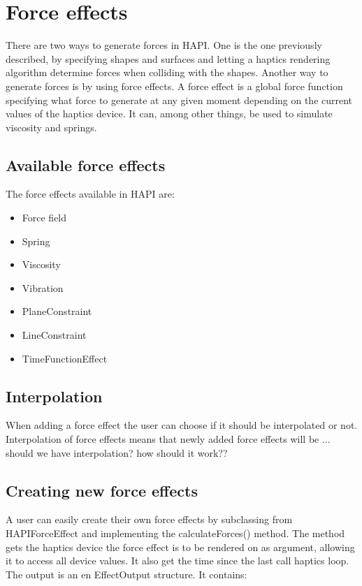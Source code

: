 \chapter{Force effects}
There are two ways to generate forces in HAPI. One is the one
previously described, by specifying shapes and surfaces and letting
a haptics rendering algorithm determine forces when colliding with the
shapes. Another way to generate forces is by using force effects. A
force effect is a global force function specifying what force to
generate at any given moment depending on the current values of the
haptics device. It can, among other things, be used to simulate
viscosity and springs. 

\section{Available force effects}
The force effects available in HAPI are:

\begin{itemize}
\item Force field
\item Spring
\item Viscosity
\item Vibration
\item PlaneConstraint
\item LineConstraint
\item TimeFunctionEffect 
\end{itemize}

\section{Interpolation}
When adding a force effect the user can choose if it should be
interpolated or not. Interpolation of force effects means that newly
added force effects will be ... should we have interpolation? how
should it work??  

\section{Creating new force effects}
A user can easily create their own force effects by subclassing from
HAPIForceEffect and implementing the calculateForces() method. The
method gets the haptics device the force effect is to be rendered on
as argument, allowing it to access all device values. It also get the
time since the last call haptics loop. The output is an en
EffectOutput structure. It contains:

